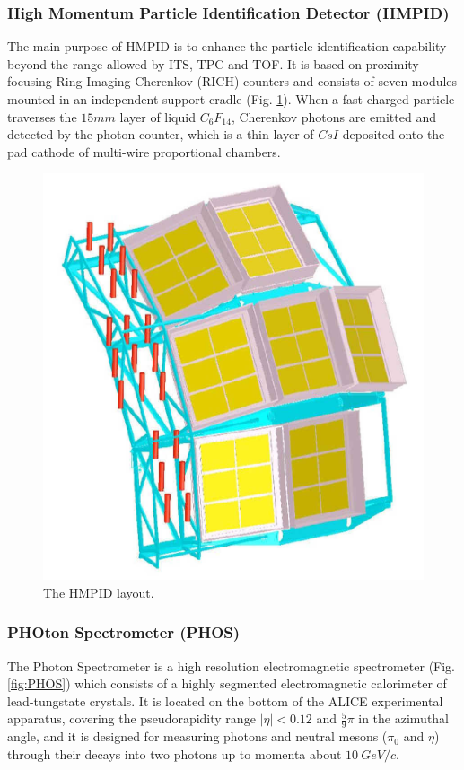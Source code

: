 \subsubsection{High Momentum Particle Identification Detector (HMPID)}
The main purpose of HMPID is to enhance the particle identification capability beyond the range allowed by ITS, TPC and TOF. 
It is based on proximity focusing Ring Imaging Cherenkov (RICH) counters and consists of seven modules mounted in an independent support cradle (Fig. \ref{fig:HMPID}). 
When a fast charged particle traverses the $15 mm$ layer of liquid $C_6F_{14}$, Cherenkov photons are emitted and detected by the photon counter, which is a thin layer of $CsI$ deposited onto the pad cathode of multi-wire proportional chambers.

\begin{figure}[!h]
\begin{center}
\includegraphics[width=0.4\linewidth]{Chapters/Introduction/Figs/hmpid.pdf}
\caption{The HMPID layout.}
\label{fig:HMPID}
\end{center}
\end{figure}

\subsubsection{PHOton Spectrometer (PHOS)}
The Photon Spectrometer is a high resolution electromagnetic spectrometer (Fig. \ref{fig:PHOS}) which consists of a highly segmented electromagnetic calorimeter of lead-tungstate crystals.
It is located on the bottom of the ALICE experimental apparatus, covering the pseudorapidity range $|\eta| < 0.12$ and $\frac{5}{9}\pi$ in the azimuthal angle, and it is designed for measuring photons and neutral mesons ($\pi_0$ and $\eta$) through their decays into two photons up to momenta about $10\ GeV/c$.

